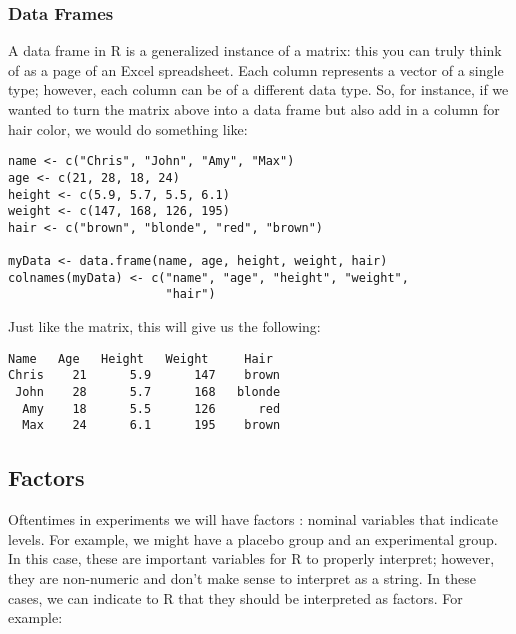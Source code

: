 \subsubsection{Data Frames}
A data frame  in R is a generalized instance of a matrix: this you can truly think of as a page of an Excel spreadsheet. Each column represents a vector of a single type; however, each column can be of a different data type. So, for instance, if we wanted to turn the matrix above into a data frame but also add in a column for hair color, we would do something like:

\begin{framed}
\begin{Verbatim}[samepage=TRUE]
name <- c("Chris", "John", "Amy", "Max")
age <- c(21, 28, 18, 24)
height <- c(5.9, 5.7, 5.5, 6.1)
weight <- c(147, 168, 126, 195)
hair <- c("brown", "blonde", "red", "brown")
 
myData <- data.frame(name, age, height, weight, hair)
colnames(myData) <- c("name", "age", "height", "weight",
                      "hair")
\end{Verbatim}
\end{framed}

Just like the matrix, this will give us the following:

\begin{framed}
\begin{Verbatim}[samepage=TRUE]
 Name   Age   Height   Weight     Hair
Chris    21      5.9      147    brown
 John    28      5.7      168   blonde
  Amy    18      5.5      126      red
  Max    24      6.1      195    brown
\end{Verbatim}
\end{framed}

\subsection{Factors}
Oftentimes in experiments we will have factors : nominal variables that indicate levels. For example, we might have a placebo group and an experimental group. In this case, these are important variables for R to properly interpret; however, they are non-numeric and don't make sense to interpret as a string. In these cases, we can indicate to R that they should be interpreted as factors. For example:


